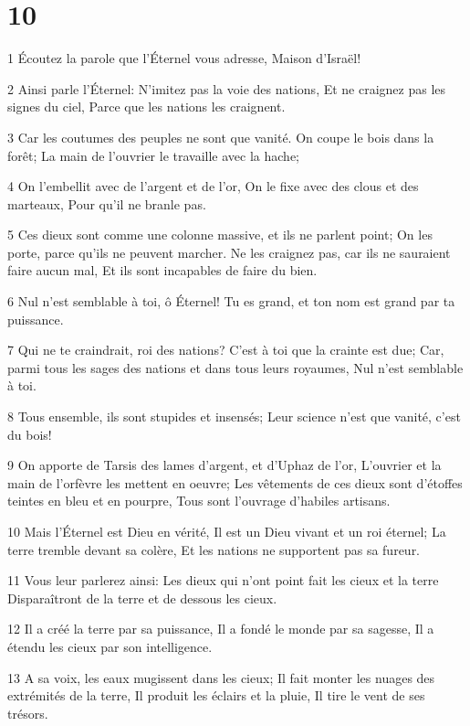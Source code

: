 \chapter{10}

\par 1 Écoutez la parole que l'Éternel vous adresse, Maison d'Israël!
\par 2 Ainsi parle l'Éternel: N'imitez pas la voie des nations, Et ne craignez pas les signes du ciel, Parce que les nations les craignent.
\par 3 Car les coutumes des peuples ne sont que vanité. On coupe le bois dans la forêt; La main de l'ouvrier le travaille avec la hache;
\par 4 On l'embellit avec de l'argent et de l'or, On le fixe avec des clous et des marteaux, Pour qu'il ne branle pas.
\par 5 Ces dieux sont comme une colonne massive, et ils ne parlent point; On les porte, parce qu'ils ne peuvent marcher. Ne les craignez pas, car ils ne sauraient faire aucun mal, Et ils sont incapables de faire du bien.
\par 6 Nul n'est semblable à toi, ô Éternel! Tu es grand, et ton nom est grand par ta puissance.
\par 7 Qui ne te craindrait, roi des nations? C'est à toi que la crainte est due; Car, parmi tous les sages des nations et dans tous leurs royaumes, Nul n'est semblable à toi.
\par 8 Tous ensemble, ils sont stupides et insensés; Leur science n'est que vanité, c'est du bois!
\par 9 On apporte de Tarsis des lames d'argent, et d'Uphaz de l'or, L'ouvrier et la main de l'orfèvre les mettent en oeuvre; Les vêtements de ces dieux sont d'étoffes teintes en bleu et en pourpre, Tous sont l'ouvrage d'habiles artisans.
\par 10 Mais l'Éternel est Dieu en vérité, Il est un Dieu vivant et un roi éternel; La terre tremble devant sa colère, Et les nations ne supportent pas sa fureur.
\par 11 Vous leur parlerez ainsi: Les dieux qui n'ont point fait les cieux et la terre Disparaîtront de la terre et de dessous les cieux.
\par 12 Il a créé la terre par sa puissance, Il a fondé le monde par sa sagesse, Il a étendu les cieux par son intelligence.
\par 13 A sa voix, les eaux mugissent dans les cieux; Il fait monter les nuages des extrémités de la terre, Il produit les éclairs et la pluie, Il tire le vent de ses trésors.
